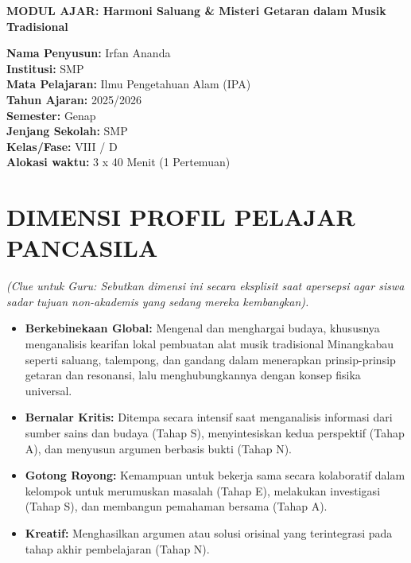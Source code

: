 \documentclass[12pt,a4paper]{article}
\begin{document}
\begin{center}
\textbf{\Large MODUL AJAR: Harmoni Saluang \& Misteri Getaran dalam Musik Tradisional}
\end{center}

\vspace{0.5cm}

\begin{tcolorbox}[mystyle]
\textbf{Nama Penyusun:} Irfan Ananda \\
\textbf{Institusi:} SMP \\
\textbf{Mata Pelajaran:} Ilmu Pengetahuan Alam (IPA) \\
\textbf{Tahun Ajaran:} 2025/2026 \\
\textbf{Semester:} Genap \\
\textbf{Jenjang Sekolah:} SMP \\
\textbf{Kelas/Fase:} VIII / D \\
\textbf{Alokasi waktu:} 3 x 40 Menit (1 Pertemuan)
\end{tcolorbox}

\section{DIMENSI PROFIL PELAJAR PANCASILA}
\textit{(Clue untuk Guru: Sebutkan dimensi ini secara eksplisit saat apersepsi agar siswa sadar tujuan non-akademis yang sedang mereka kembangkan).}

\begin{itemize}
\item \textbf{Berkebinekaan Global:} Mengenal dan menghargai budaya, khususnya menganalisis kearifan lokal pembuatan alat musik tradisional Minangkabau seperti saluang, talempong, dan gandang dalam menerapkan prinsip-prinsip getaran dan resonansi, lalu menghubungkannya dengan konsep fisika universal.
\item \textbf{Bernalar Kritis:} Ditempa secara intensif saat menganalisis informasi dari sumber sains dan budaya (Tahap S), menyintesiskan kedua perspektif (Tahap A), dan menyusun argumen berbasis bukti (Tahap N).
\item \textbf{Gotong Royong:} Kemampuan untuk bekerja sama secara kolaboratif dalam kelompok untuk merumuskan masalah (Tahap E), melakukan investigasi (Tahap S), dan membangun pemahaman bersama (Tahap A).
\item \textbf{Kreatif:} Menghasilkan argumen atau solusi orisinal yang terintegrasi pada tahap akhir pembelajaran (Tahap N).
\end{itemize}
\end{document}
